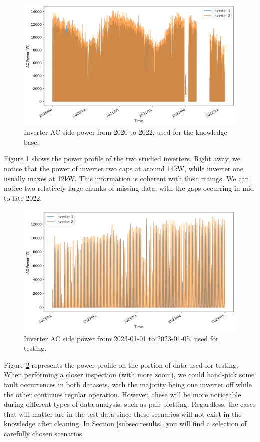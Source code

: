 \begin{figure}[h!]
    \centering
    \includegraphics[width=\textwidth]{figures/chapter5/analysis/00_power_kb-1.png}
    \caption{Inverter AC side power from 2020 to 2022, used for the knowledge base.}
    \label{fig:eda_power_kb}
\end{figure}

Figure \ref{fig:eda_power_kb} shows the power profile of the two studied inverters. Right away, we notice that the power of inverter two caps at around 14kW, while inverter one usually maxes at 12kW. This information is coherent with their ratings. We can notice two relatively large chunks of missing data, with the gaps occurring in mid to late 2022.

\begin{figure}[h!]
    \centering
    \includegraphics[width=\textwidth]{figures/chapter5/analysis/01_power_test-1.png}
    \caption{Inverter AC side power from 2023-01-01 to 2023-01-05, used for testing.}
    \label{fig:eda_power_test}
\end{figure}

Figure \ref{fig:eda_power_test} represents the power profile on the portion of data used for testing. When performing a closer inspection (with more zoom), we could hand-pick some fault occurrences in both datasets, with the majority being one inverter off while the other continues regular operation. However, these will be more noticeable during different types of data analysis, such as pair plotting. Regardless, the cases that will matter are in the test data since these scenarios will not exist in the knowledge after cleaning. In Section \ref{subsec:results}, you will find a selection of carefully chosen scenarios.

